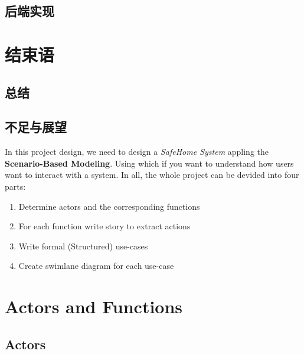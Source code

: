 \documentclass[twoside,11pt]{article}
\begin{document}
\subsection{后端实现}



\section{结束语}
\subsection{总结}
\subsection{不足与展望}




In this project design, we need to design a \emph{SafeHome System} appling the \textbf{Scenario-Based Modeling}. Using which if you want to understand how users want to interact with a system\cite{roger2015software}. In all, the whole project can be devided into four parts:
\begin{enumerate}
    \item Determine actors and the corresponding functions
    \item For each function write story to extract actions
    \item Write formal (Structured) use-cases
    \item Create swimlane diagram for each use-case
\end{enumerate}

\section{Actors and Functions}

\subsection{Actors}
\end{document}
